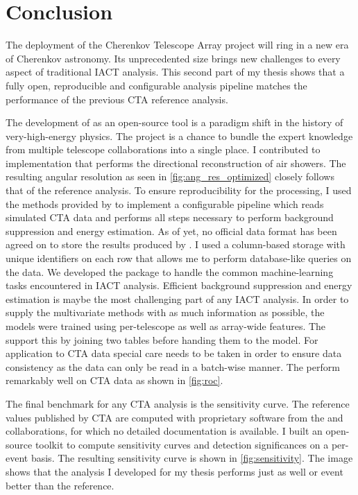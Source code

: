 \chapter{Conclusion}

The deployment of the Cherenkov Telescope Array project will ring in a new era of Cherenkov astronomy. 
Its unprecedented size brings new challenges to every aspect of traditional IACT analysis. 
This second part of my thesis shows that a fully open, reproducible and configurable 
analysis pipeline matches the performance of the previous CTA reference analysis. 

The development of \ctapipe as an open-source tool is a paradigm shift in the history of very-high-energy physics. 
The \ctapipe project is a chance to bundle the expert knowledge from multiple telescope collaborations
into a single place. I contributed to \ctapipe implementation that performs the directional reconstruction 
of air showers. The resulting angular resolution as seen in \cref{fig:ang_res_optimized}
closely follows that of the reference analysis. 
To ensure reproducibility for the processing, I used the methods provided by \ctapipe 
to implement a configurable pipeline which reads simulated CTA data and performs all steps necessary
to perform background suppression and energy estimation. 
As of yet, no official data format has been agreed on to store the results produced by \ctapipe. 
I used a column-based storage with unique identifiers on each row that allows 
me to perform database-like queries on the data.
We developed the \aicttools package to handle the common machine-learning tasks encountered in IACT analysis.
Efficient background suppression and energy estimation is maybe the most challenging part of any IACT analysis.
In order to supply the multivariate methods with as much information as possible, the models were trained 
using per-telescope as well as array-wide features. 
The \aicttools support this by joining two tables before handing them to the model.
For application to CTA data special care needs to be taken in order to ensure data consistency
as the data can only be read in a batch-wise manner.
The \aicttools perform remarkably well on CTA data as shown in \cref{fig:roc}. 

The final benchmark for any CTA analysis is the sensitivity curve.
The reference values published by CTA are computed with proprietary software from the \magic and \veritas 
collaborations, for which no detailed documentation is available. 
I built an open-source toolkit to compute sensitivity curves and detection significances on a per-event basis.    
The resulting sensitivity curve is shown in \cref{fig:sensitivity}. 
The image shows that the analysis I developed for my thesis performs just as well or event better than the reference. 

